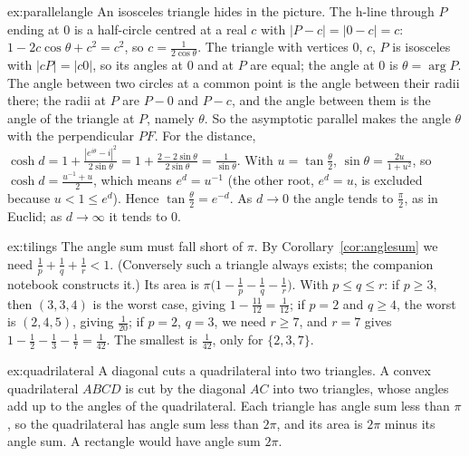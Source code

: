 \begin{solution}{ex:parallelangle}
\idea An isosceles triangle hides in the picture.
\writeup The h-line through $P$ ending at $0$ is a half-circle centred at a real $c$ with $|P-c|=|0-c|=c$: $1-2c\cos\theta+c^2=c^2$, so $c=\frac1{2\cos\theta}$.
The triangle with vertices $0$, $c$, $P$ is isosceles with $|cP|=|c0|$, so its angles at $0$ and at $P$ are equal; the angle at $0$ is $\theta=\arg P$. The angle
between two circles at a common point is the angle between their radii there; the radii at $P$ are $P-0$ and $P-c$, and the angle between them is the angle of the
triangle at $P$, namely $\theta$. So the asymptotic parallel makes the angle $\theta$ with the perpendicular $PF$. For the distance,
$\cosh d=1+\frac{|e^{i\theta}-i|^2}{2\sin\theta}=1+\frac{2-2\sin\theta}{2\sin\theta}=\frac1{\sin\theta}$. With $u=\tan\frac\theta2$, $\sin\theta=\frac{2u}{1+u^2}$, so
$\cosh d=\frac{u^{-1}+u}2$, which means $e^{d}=u^{-1}$ (the other root, $e^d=u$, is excluded because $u<1\le e^d$). Hence $\tan\frac\theta2=e^{-d}$. As $d\to0$
the angle tends to $\frac\pi2$, as in Euclid; as $d\to\infty$ it tends to $0$.
\end{solution}

\begin{solution}{ex:tilings}
\idea The angle sum must fall short of $\pi$.
\writeup By Corollary~\ref{cor:anglesum} we need $\frac1p+\frac1q+\frac1r<1$. (Conversely such a
triangle always exists; the companion notebook constructs it.) Its area is $\pi\bigl(1-\frac1p-\frac1q-\frac1r\bigr)$. With
$p\le q\le r$: if $p\ge3$, then $(3,3,4)$ is the worst case, giving $1-\frac{11}{12}=\frac1{12}$; if $p=2$ and $q\ge4$, the worst is $(2,4,5)$, giving $\frac1{20}$;
if $p=2$, $q=3$, we need $r\ge7$, and $r=7$ gives $1-\frac12-\frac13-\frac17=\frac1{42}$. The smallest is $\frac1{42}$, only for $\{2,3,7\}$.
\end{solution}

\begin{solution}{ex:quadrilateral}
\idea A diagonal cuts a quadrilateral into two triangles.
\writeup A convex quadrilateral $ABCD$ is cut by the diagonal $AC$ into two triangles, whose angles add up to the angles of the quadrilateral. Each triangle has
angle sum less than $\pi$, so the quadrilateral has angle sum less than $2\pi$, and its area is $2\pi$ minus its angle sum. A rectangle would have angle sum
$2\pi$.
\end{solution}

